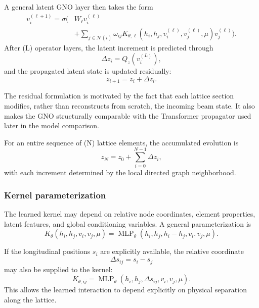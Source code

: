 \documentclass[11pt,a4paper]{article}
\begin{document}
\begin{sloppypar}
A general latent GNO layer then takes the form
\begin{equation}
\begin{split}
v_i^{(\ell+1)}
=
\sigma
\Bigg(
&
W_{\ell}v_i^{(\ell)}
\\
&+
\sum_{j\in\mathcal{N}(i)}
\omega_{ij}
K_{\theta,\ell}
\left(
h_i,
h_j,
v_i^{(\ell)},
v_j^{(\ell)},
\mu
\right)
v_j^{(\ell)}
\Bigg).
\end{split}
\label{eq:gno_latent_layer}
\end{equation}
After (L) operator layers, the latent increment is predicted through
\begin{equation}
\Delta z_i
=
Q_z
\left(
v_i^{(L)}
\right),
\label{eq:gno_latent_increment}
\end{equation}
and the propagated latent state is updated residually:
\begin{equation}
z_{i+1}
=
z_i
+
\Delta z_i.
\label{eq:gno_residual_update}
\end{equation}

The residual formulation is motivated by the fact that each lattice section modifies, rather than reconstructs from scratch, the incoming beam state. It also makes the GNO structurally comparable with the Transformer propagator used later in the model comparison.

For an entire sequence of (N) lattice elements, the accumulated evolution is
\begin{equation}
z_N
=
z_0
+
\sum_{i=0}^{N-1}
\Delta z_i,
\label{eq:gno_cumulative_latent_evolution}
\end{equation}
with each increment determined by the local directed graph neighborhood.

\subsubsection{Kernel parameterization}
\label{subsubsec:gno_kernel_parameterization}

The learned kernel may depend on relative node coordinates, element properties, latent features, and global conditioning variables. A general parameterization is
\begin{equation}
K_{\theta}
\left(
h_i,
h_j,
v_i,
v_j,
\mu
\right)
=
\operatorname{MLP}_{\theta}
\left(
h_i,
h_j,
h_i-h_j,
v_i,
v_j,
\mu
\right).
\label{eq:gno_kernel_mlp}
\end{equation}

If the longitudinal positions $s_i$ are explicitly available, the relative coordinate
\begin{equation}
\Delta s_{ij}
=
s_i-s_j
\end{equation}
may also be supplied to the kernel:
\begin{equation}
K_{\theta,ij}
=
\operatorname{MLP}_{\theta}
\left(
h_i,
h_j,
\Delta s_{ij},
v_i,
v_j,
\mu
\right).
\label{eq:gno_relative_kernel}
\end{equation}
This allows the learned interaction to depend explicitly on physical separation along the lattice.


\end{sloppypar}
\end{document}
